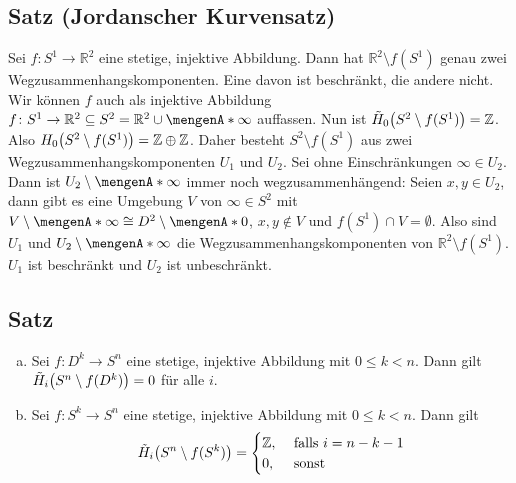 \subsection{Satz (Jordanscher Kurvensatz)} %
\label{sub:109}
Sei $f \colon S^1 \to \mathds{R}^2$ eine stetige, injektive Abbildung. Dann hat $\mathds{R}^2 \setminus f(S^1)$ genau zwei Wegzusammenhangskomponenten. Eine davon ist 
beschränkt, die andere nicht.
Wir können $f$ auch als injektive Abbildung $f \colon S^1 \to \mathds{R}^2 \subseteq S^2 = \mathds{R}^2 \cup \set{\infty}$ auffassen. Nun ist 
$\tilde{H}_0 \enbrace[\big]{S^2 \setminus f(S^1)} =\mathds{Z}$. Also $H_0 \enbrace[\big]{S^2 \setminus f(S^1)}= \mathds{Z} \oplus \mathds{Z}$. Daher besteht
$S^2 \setminus f(S^1)$ aus zwei Wegzusammenhangskomponenten $U_1$ und $U_2$. Sei ohne Einschränkungen $\infty \in U_2$. Dann ist $U_2 \setminus \set{\infty}$ immer noch
wegzusammenhängend: Seien $x,y \in U_2$, dann gibt es eine Umgebung $V$ von $\infty \in S^2$ mit $V \setminus \set{\infty} \cong D^2 \setminus \set{0} $, $x,y \not\in V$ und
$f(S^1) \cap V = \emptyset$. Also sind $U_1$ und $U_2 \setminus \set{\infty}$ die Wegzusammenhangskomponenten von $\mathds{R}^2 \setminus f(S^1)$. $U_1$ ist beschränkt und
$U_2$ ist unbeschränkt. \bewende

\subsection[Satz: Homologie von $S^n$ ohne Einbettung vonScheiben $D^k$ und Sphären $S^k$ mit $k<n$]{Satz} %
\label{sub:1010}
\begin{enumerate}[a)]
	\item Sei $f \colon D^k \to S^n$ eine stetige, injektive Abbildung mit $0 \le k < n$. Dann gilt $\tilde{H}_i\enbrace[\big]{S^n \setminus f(D^k)} =0$ für alle $i$.
	\item Sei $f \colon S^k \to S^n$ eine stetige, injektive Abbildung mit $0 \le k < n$. Dann gilt 
	\[
		\tilde{H}_i \enbrace[\big]{S^n \setminus f(S^k)} = \begin{cases}
			\mathds{Z}, &\text{ falls }i=n-k-1\\
			0, &\text{ sonst}
		\end{cases}
	\]
\end{enumerate}

